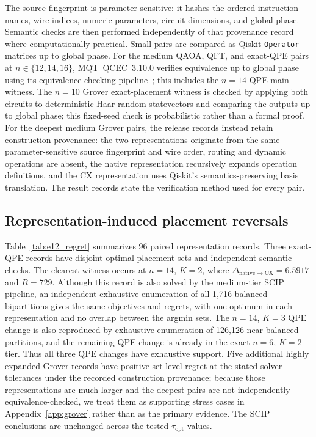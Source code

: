 \documentclass[
  aps,
  pra,
  reprint,
  amsmath,
  amssymb,
  longbibliography,
  nofootinbib,
  floatfix
]{revtex4-2}
\theoremstyle{plain}
\begin{document}
The source fingerprint is parameter-sensitive: it hashes the ordered instruction names, wire indices, numeric parameters, circuit dimensions, and global phase. Semantic checks are then performed independently of that provenance record where computationally practical. Small pairs are compared as Qiskit \texttt{Operator} matrices up to global phase. For the medium QAOA, QFT, and exact-QPE pairs at $n\in\{12,14,16\}$, MQT~QCEC~3.10.0 verifies equivalence up to global phase using its equivalence-checking pipeline~\cite{burgholzer2021qcec}; this includes the $n=14$ QPE main witness. The $n=10$ Grover exact-placement witness is checked by applying both circuits to deterministic Haar-random statevectors and comparing the outputs up to global phase; this fixed-seed check is probabilistic rather than a formal proof. For the deepest medium Grover pairs, the release records instead retain construction provenance: the two representations originate from the same parameter-sensitive source fingerprint and wire order, routing and dynamic operations are absent, the native representation recursively expands operation definitions, and the CX representation uses Qiskit's semantics-preserving basis translation. The result records state the verification method used for every pair.

\subsection{Representation-induced placement reversals}
\label{sec:results-reversals}

Table~\ref{tab:e12_regret} summarizes 96 paired representation records. Three exact-QPE records have disjoint optimal-placement sets and independent semantic checks. The clearest witness occurs at $n=14$, $K=2$, where $\Delta_{\mathrm{native}\to\mathrm{CX}}=6.5917$ and $R=729$. Although this record is also solved by the medium-tier SCIP pipeline, an independent exhaustive enumeration of all 1,716 balanced bipartitions gives the same objectives and regrets, with one optimum in each representation and no overlap between the argmin sets. The $n=14$, $K=3$ QPE change is also reproduced by exhaustive enumeration of 126,126 near-balanced partitions, and the remaining QPE change is already in the exact $n=6$, $K=2$ tier. Thus all three QPE changes have exhaustive support. Five additional highly expanded Grover records have positive set-level regret at the stated solver tolerances under the recorded construction provenance; because those representations are much larger and the deepest pairs are not independently equivalence-checked, we treat them as supporting stress cases in Appendix~\ref{app:grover} rather than as the primary evidence. The SCIP conclusions are unchanged across the tested $\tau_{\mathrm{opt}}$ values.
\end{document}
